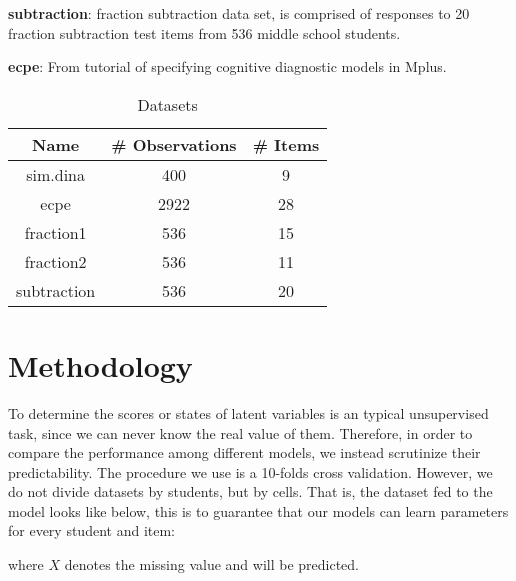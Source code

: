 \documentclass[11pt]{article}
\begin{document}
\textbf{subtraction}: \cite{tatsuoka1984analysis} fraction subtraction data set, is comprised of responses to 20 fraction subtraction test items from 536 middle school students.

\textbf{ecpe}: From \cite{templin2013obtaining} tutorial of specifying cognitive diagnostic models in Mplus.

\begin{table}[!h]
\begin{center}
\begin{tabular}{|c|c|c|}
\hline
Name & \# Observations & \# Items \\
\hline
sim.dina & 400 & 9 \\
\hline
ecpe & 2922 & 28 \\
\hline
fraction1 & 536 & 15 \\
\hline
fraction2 & 536 & 11 \\
\hline
subtraction & 536 & 20 \\
\hline
\end{tabular}
\end{center}
\caption{Datasets}\label{tab:datasets}
\end{table}

\section{Methodology}
\label{sec:Methodology}
To determine the scores or states of latent variables is an typical unsupervised task, since we can never know the real value of them. Therefore, in order to compare the performance among different models, we instead scrutinize their predictability. The procedure we use is a 10-folds cross validation. However, we do not divide datasets by students, but by cells. That is, the dataset fed to the model looks like below, this is to guarantee that our models can learn parameters for every student and item:


where $X$ denotes the missing value and will be predicted.  
\end{document}

